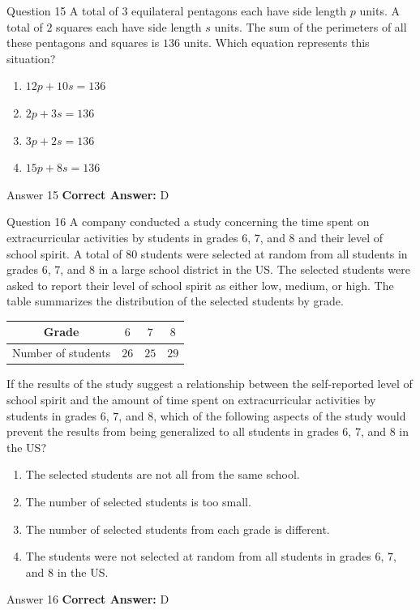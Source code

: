 \documentclass{beamer}
\begin{document}
\begin{frame}{Question 15}
\small
A total of \(3\) equilateral pentagons each have side length \(p\) units.
A total of \(2\) squares each have side length \(s\) units.
The sum of the perimeters of all these pentagons and squares is \(136\) units.
Which equation represents this situation?
\vspace{0.35cm}
\begin{enumerate}
    \item[A.] \(12p + 10s = 136\)
    \item[B.] \(2p + 3s = 136\)
    \item[C.] \(3p + 2s = 136\)
    \item[D.] \(15p + 8s = 136\)
\end{enumerate}
\end{frame}
\begin{frame}{Answer 15}
\small
\textbf{Correct Answer:} D
\end{frame}

\begin{frame}{Question 16}
\small
A company conducted a study concerning the time spent on extracurricular activities by students in grades \(6\), \(7\), and \(8\) and their level of school spirit.
A total of \(80\) students were selected at random from all students in grades \(6\), \(7\), and \(8\) in a large school district in the US.
The selected students were asked to report their level of school spirit as either low, medium, or high.
The table summarizes the distribution of the selected students by grade.

\begin{center}
\begin{tabular}{|c|c|c|c|}
\hline
Grade & \(6\) & \(7\) & \(8\) \\
\hline
Number of students & \(26\) & \(25\) & \(29\) \\
\hline
\end{tabular}
\end{center}

If the results of the study suggest a relationship between the self-reported level of school spirit and the amount of time spent on extracurricular activities by students in grades \(6\), \(7\), and \(8\), which of the following aspects of the study would prevent the results from being generalized to all students in grades \(6\), \(7\), and \(8\) in the US?
\vspace{0.35cm}
\begin{enumerate}
    \item[A.] The selected students are not all from the same school.
    \item[B.] The number of selected students is too small.
    \item[C.] The number of selected students from each grade is different.
    \item[D.] The students were not selected at random from all students in grades \(6\), \(7\), and \(8\) in the US.
\end{enumerate}
\end{frame}
\begin{frame}{Answer 16}
\small
\textbf{Correct Answer:} D
\end{frame}
\end{document}
